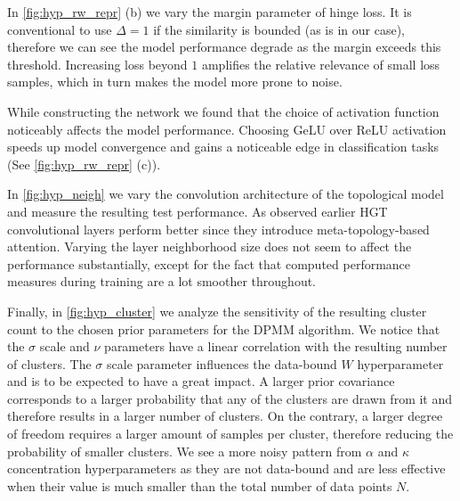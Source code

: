 In \cref{fig:hyp_rw_repr} (b) we vary the margin parameter of hinge loss. 
It is conventional to use $\Delta = 1$ if the similarity is bounded (as is in our case), therefore we can see the model performance degrade as the margin exceeds this threshold.
Increasing loss beyond $1$ amplifies the relative relevance of small loss samples, which in turn makes the model more prone to noise.

While constructing the network we found that the choice of activation function noticeably affects the model performance. 
Choosing GeLU over ReLU activation speeds up model convergence and gains a noticeable edge in classification tasks (See \cref{fig:hyp_rw_repr} (c)).



In \cref{fig:hyp_neigh} we vary the convolution architecture of the topological model and measure the resulting test performance.
As observed earlier HGT convolutional layers perform better since they introduce meta-topology-based attention. 
Varying the layer neighborhood size does not seem to affect the performance substantially, except for the fact that computed performance measures during training are a lot smoother throughout.



Finally, in \cref{fig:hyp_cluster} we analyze the sensitivity of the resulting cluster count to the chosen prior parameters for the DPMM algorithm.
We notice that the $\sigma$ scale and $\nu$ parameters have a linear correlation with the resulting number of clusters.
The $\sigma$ scale parameter influences the data-bound $W$ hyperparameter and is to be expected to have a great impact.
A larger prior covariance corresponds to a larger probability that any of the clusters are drawn from it and therefore results in a larger number of clusters.
On the contrary, a larger degree of freedom requires a larger amount of samples per cluster, therefore reducing the probability of smaller clusters.
We see a more noisy pattern from $\alpha$ and $\kappa$ concentration hyperparameters as they are not data-bound and are less effective when their value is much smaller than the total number of data points $N$.


